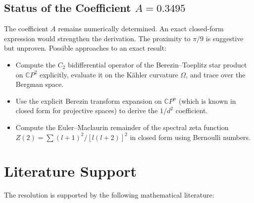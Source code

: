 \documentclass[12pt,a4paper]{article}
\theoremstyle{definition}
\begin{document}
\subsection{Status of the Coefficient $A = 0.3495$}

The coefficient $A$ remains numerically determined.  An exact closed-form
expression would strengthen the derivation.  The proximity to $\pi/9$
is suggestive but unproven.  Possible approaches to an exact result:
\begin{itemize}
\item Compute the $C_2$ bidifferential operator of the Berezin--Toeplitz
  star product on $\mathbb{C}P^2$ explicitly, evaluate it on the
  K\"ahler curvature $\Omega$, and trace over the Bergman space.
\item Use the explicit Berezin transform expansion on $\mathbb{C}P^n$
  (which is known in closed form for projective spaces) to derive the
  $1/d^2$ coefficient.
\item Compute the Euler--Maclaurin remainder of the spectral zeta
  function $Z(2) = \sum (l+1)^2/[l(l+2)]^2$ in closed form using
  Bernoulli numbers.
\end{itemize}

\section{Literature Support}
\label{sec:literature}

The resolution is supported by the following mathematical literature:
\end{document}
